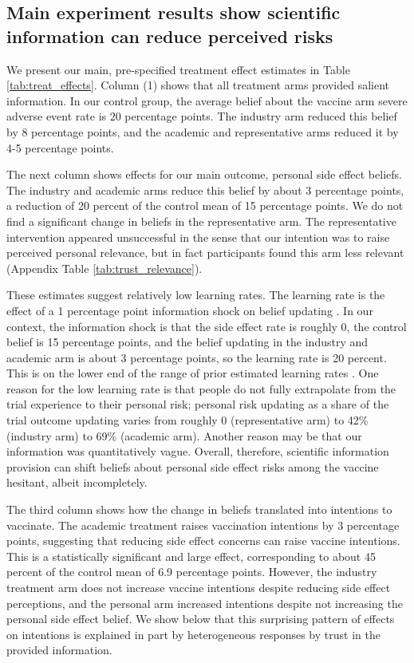 \subsection{Main experiment results show scientific information can reduce perceived risks}

We present our main, pre-specified treatment effect estimates in Table \ref{tab:treat_effects}. 
Column (1) shows that all treatment arms provided salient information. 
In our control group, the average belief about the vaccine arm severe adverse event rate 
is 20 percentage points. The industry arm reduced this belief by 8 percentage points, 
and the academic and representative arms reduced it by 4-5 percentage points. 

The next column shows effects for our main outcome, personal side effect beliefs. 
The industry and academic arms reduce this belief by about 3 percentage points,
a reduction of 20 percent of the control mean of 15 percentage points. 
We do not find a significant 
change in beliefs in the representative arm. The representative intervention appeared 
unsuccessful in the sense that our intention was to raise perceived personal relevance, 
but in fact  participants found this arm less relevant 
(Appendix Table \ref*{tab:trust_relevance}).

These estimates suggest relatively low learning rates. The learning rate is 
the effect of a 1 percentage point information shock on belief updating 
\citep{haaland2023designing}. In our context, the information shock is that the 
side effect rate is roughly 0, the control belief is 15 percentage points, and the 
belief updating in the industry and academic arm is about 3 percentage points, so the learning 
rate is 20 percent.
This is on the lower end of the range of prior estimated learning rates 
\citep{haaland2023designing}. One reason for the low learning rate is that people 
do not fully extrapolate from the trial experience 
to their personal risk; personal risk updating as a share of the trial outcome updating varies 
from roughly 0 (representative arm) to 42\% (industry arm) to 69\% (academic arm). 
Another reason may be that our information was quantitatively vague.
Overall, therefore, scientific information provision can shift beliefs about personal side 
effect risks among the vaccine hesitant, albeit incompletely.

The third column shows how the change in beliefs translated into intentions to vaccinate. 
The academic treatment raises vaccination intentions by 3 percentage points, suggesting that 
reducing side effect concerns can raise vaccine intentions. This is a statistically
significant and large effect, corresponding to about 45 percent of the control mean
of 6.9 percentage points.
However, the industry treatment arm 
does not increase vaccine intentions despite reducing side effect perceptions, and the personal 
arm increased intentions despite not increasing the personal side effect belief. We show below 
that this surprising pattern of effects on intentions is explained in part by heterogeneous 
responses by trust in the provided information.

